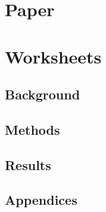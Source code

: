 \fancyhf{}
\fancyfoot[C]{\thepage} %
\fancyhead[RE,LO]{}																												%
\fancyhead[RE,LO]{\color{aaublue}\small\nouppercase\leftmark} %
\pagestyle{fancy}



\part{Paper}



\part{Worksheets}
\chapter{Background}









\chapter{Methods}

\chapter{Results}
	
\printbibliography\clearpage



\cleardoublepage
\begin{appendices}
\chapter{Appendices}

\end{appendices}



